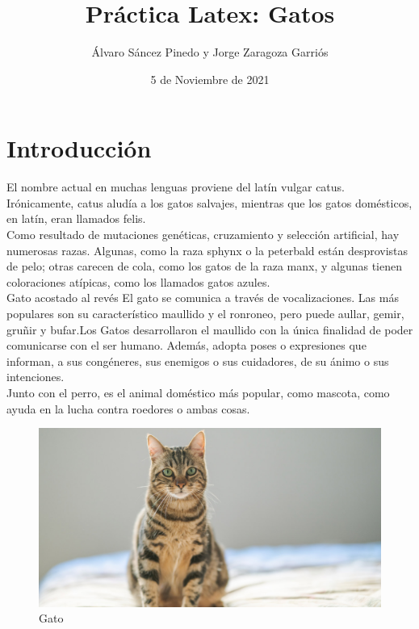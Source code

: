 \documentclass[a4paper]{article}
\title{Práctica Latex: Gatos}
\author{Álvaro Sáncez Pinedo y Jorge Zaragoza Garriós}
\date{ 5 de Noviembre de 2021}
\begin{document}
\maketitle


\pagebreak



\section{Introducción}

El nombre actual en muchas lenguas proviene del latín vulgar catus. Irónicamente, catus aludía a los gatos salvajes, mientras que los gatos domésticos, en latín, eran llamados felis. \\

Como resultado de mutaciones genéticas, cruzamiento y selección artificial, hay numerosas razas. Algunas, como la raza sphynx o la peterbald están desprovistas de pelo; otras carecen de cola, como los gatos de la raza manx, y algunas tienen coloraciones atípicas, como los llamados gatos azules. \\

Gato acostado al revés
El gato se comunica a través de vocalizaciones. Las más populares son su característico maullido y el ronroneo, pero puede aullar, gemir, gruñir y bufar.Los Gatos desarrollaron el maullido con la única finalidad de poder comunicarse con el ser humano. Además, adopta poses o expresiones que informan, a sus congéneres, sus enemigos o sus cuidadores, de su ánimo o sus intenciones.\\

Junto con el perro, es el animal doméstico más popular, como mascota, como ayuda en la lucha contra roedores o ambas cosas.
\\


\begin{figure}[h!]
\centering
\includegraphics[scale=0.3]{gato.jpg}
\caption{Gato}
\label{fig:Gato1}
\end{figure}
\end{document}
